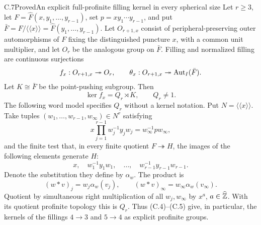 \begin{result}{C.7}{Proved}{An explicit full-profinite filling kernel in every spherical size}
Let $r\geq3$, let $F=\widehat F(x,y_1,\ldots,y_{r-1})$, set $p=xy_1\cdots y_{r-1}$, and put $\bar F=F/\langle\!\langle x\rangle\!\rangle=\widehat F(y_1,\ldots,y_{r-1})$. Let $O_{r+1,x}$ consist of peripheral-preserving outer automorphisms of $F$ fixing the distinguished puncture $x$, with a common unit multiplier, and let $O_r$ be the analogous group on $\bar F$. Filling and normalized filling are continuous surjections
\[
 f_x:O_{r+1,x}\twoheadrightarrow O_r,
 \qquad\theta_x:O_{r+1,x}\twoheadrightarrow\operatorname{Aut}_I(\bar F).
\]
Let $K\cong\bar F$ be the point-pushing subgroup. Then
\[
 \ker f_x=Q_r\rtimes K,\qquad Q_r\ne1.                      \tag{C.4}
\]
The following word model specifies $Q_r$ without a kernel notation. Put $N=\langle\!\langle x\rangle\!\rangle$. Take tuples $(w_1,\ldots,w_{r-1},w_\infty)\in N^r$ satisfying
\[
 x\prod_{j=1}^{r-1}w_j^{-1}y_jw_j=w_\infty^{-1}p w_\infty,   \tag{C.5}
\]
and the finite test that, in every finite quotient $F\twoheadrightarrow H$,
the images of the following elements generate $H$:
\[
 x,\quad w_1^{-1}y_1w_1,\quad\ldots,\quad
 w_{r-1}^{-1}y_{r-1}w_{r-1}.
\]
Denote the substitution they define by $\alpha_w$. The product is
\[
 (w*v)_j=w_j\alpha_w(v_j),\qquad
 (w*v)_\infty=w_\infty\alpha_w(v_\infty).
\]
Quotient by simultaneous right multiplication of all $w_j,w_\infty$ by $x^a$, $a\in\widehat{\mathbb Z}$. With its quotient profinite topology this is $Q_r$. Thus (C.4)--(C.5) give, in particular, the kernels of the fillings $4\to3$ and $5\to4$ as explicit profinite groups.
\end{result}

